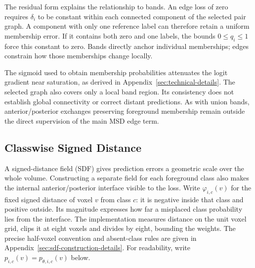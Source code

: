 \documentclass[12pt,a4paper]{article}
\begin{document}
The residual form explains the relationship to bands. An edge loss of
zero requires $\delta_i$ to be constant within each connected component
of the selected pair graph. A component with only one reference label
can therefore retain a uniform membership error. If it contains both
zero and one labels, the bounds $0\leq q_i\leq1$ force this constant
to zero. Bands directly anchor individual memberships; edges constrain
how those memberships change locally.

The sigmoid used to obtain membership probabilities attenuates the
logit gradient near saturation, as derived in
Appendix~\ref{sec:technical-details}. The selected graph also covers
only a local band region. Its consistency does not establish global
connectivity or correct distant predictions. As with union bands,
anterior/posterior exchanges preserving foreground membership remain
outside the direct supervision of the main MSD edge term.

\subsection{Classwise Signed Distance}\label{sec:sdf-constraints}

A signed-distance field (SDF) gives prediction errors a geometric scale over the whole
volume. Constructing a separate field for each foreground class also
makes the internal anterior/posterior interface visible to the loss.
Write $\varphi_{i,c}(v)$ for the fixed signed distance of voxel $v$
from class $c$: it is negative inside that class and positive outside.
Its magnitude expresses how far a misplaced class probability lies from
the interface. The implementation measures distance on the unit voxel
grid, clips it at eight voxels and divides by eight, bounding the
weights. The precise half-voxel convention and absent-class rules are
given in Appendix~\ref{sec:sdf-construction-details}. For readability,
write $p_{i,c}(v)=p_{\theta,i,c}(v)$ below.
\end{document}
